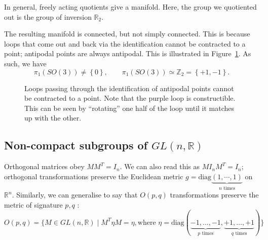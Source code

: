 \begin{example}[G = SO(3)]
  \begin{leftbar}
    \begin{remark}
      In general, freely acting quotients give a manifold. Here, the group we quotiented out is the group of inversion $\mathbb{R}_2$.
    \end{remark}
  \end{leftbar}

  The resulting manifold is connected, but not simply connected. This is because loops that come out and back via the identification cannot be contracted to a point; antipodal points are always antipodal. This is illustrated in Figure~\ref{fig:antipodal_loops}.
  As such, we have
  \begin{equation}
    \pi_1(SO(3)) \neq \left\{ 0 \right\}, \qquad \pi_1(SO(3)) \simeq \mathbb{Z}_2 = \left\{ +1, -1 \right\}.
  \end{equation}
  \begin{figure}[bhtp]
    \centering
    \def\svgwidth{0.25\columnwidth}
    
    \caption{Loops passing through the identification of antipodal points cannot be contracted to a point. Note that the purple loop is constructible. This can be seen by ``rotating'' one half of the loop until it matches up with the other.}
    \label{fig:antipodal_loops}
  \end{figure}
\end{example}

\subsection{Non-compact subgroups of \texorpdfstring{$GL(n, \mathbb{R})$}{GL(n, R)}}%
\label{sub:non_compact_subgroups_of_gl_n_r}

Orthogonal matrices obey $M M^T = I_n$. We can also read this as $M I_n M^T = I_n$; orthogonal transformations preserve the Euclidean metric $g = \text{diag}\underbrace{(1, \cdots, 1)}_{n \text{ times}}$ on $\mathbb{R}^n$.
Similarly, we can generalise to say that $O(p, q)$ transformations preserve the metric of signature $p, q$ :
\begin{equation}
  O(p, q) = \big\{ M \in GL(n, \mathbb{R}) \mid M^T \eta M = \eta, \text{where } \eta = \text{diag}(\underbrace{-1, \ldots, -1}_{p \text{ times}}, \underbrace{+1, \ldots, +1}_{q \text{ times}}) \big\}
\end{equation}

